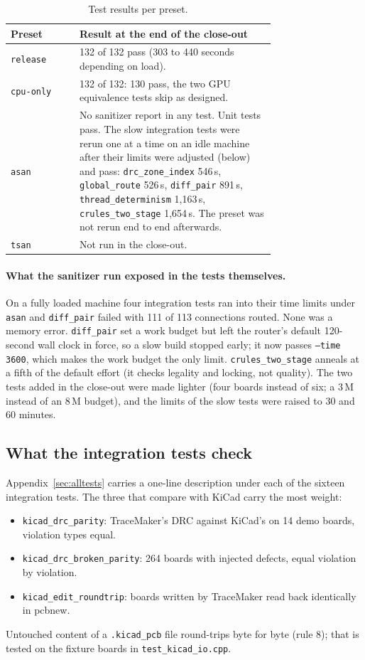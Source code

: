 \documentclass[10pt,a4paper]{article}
\newcommand{\code}[1]{\texttt{#1}}
\begin{document}
\begin{table}[H]
\centering\small
\begin{tabular}{@{}lp{0.74\linewidth}@{}}
\toprule
Preset & Result at the end of the close-out \\
\midrule
\code{release} & 132 of 132 pass (303 to 440 seconds depending on load). \\
\code{cpu-only} & 132 of 132: 130 pass, the two GPU equivalence tests skip as designed. \\
\code{asan} & No sanitizer report in any test. Unit tests pass. The slow integration tests were rerun one at a
  time on an idle machine after their limits were adjusted (below) and pass: \code{drc\_zone\_index} 546\,s,
  \code{global\_route} 526\,s, \code{diff\_pair} 891\,s, \code{thread\_determinism} 1,163\,s, \code{crules\_two\_stage}
  1,654\,s. The preset was not rerun end to end afterwards. \\
\code{tsan} & Not run in the close-out. \\
\bottomrule
\end{tabular}
\caption{Test results per preset.}
\end{table}

\paragraph{What the sanitizer run exposed in the tests themselves.} On a fully loaded machine four integration
tests ran into their time limits under \code{asan} and \code{diff\_pair} failed with 111 of 113 connections
routed. None was a memory error. \code{diff\_pair} set a work budget but left the router's default 120-second
wall clock in force, so a slow build stopped early; it now passes \code{--time 3600}, which makes the work budget
the only limit. \code{crules\_two\_stage} anneals at a fifth of the default effort (it checks legality and
locking, not quality). The two tests added in the close-out were made lighter (four boards instead of six; a
3\,M instead of an 8\,M budget), and the limits of the slow tests were raised to 30 and 60 minutes.

\subsection{What the integration tests check}

Appendix~\ref{sec:alltests} carries a one-line description under each of the sixteen integration tests. The three
that compare with KiCad carry the most weight:
\begin{itemize}
\item \code{kicad\_drc\_parity}: TraceMaker's DRC against KiCad's on 14 demo boards, violation types equal.
\item \code{kicad\_drc\_broken\_parity}: 264 boards with injected defects, equal violation by violation.
\item \code{kicad\_edit\_roundtrip}: boards written by TraceMaker read back identically in pcbnew.
\end{itemize}
Untouched content of a \code{.kicad\_pcb} file round-trips byte for byte (rule 8); that is tested on the fixture
boards in \code{test\_kicad\_io.cpp}.
\end{document}
